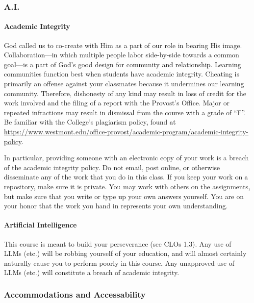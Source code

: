 \documentclass[
  twoside]{article}
\begin{document}
\subsubsection{A.I.}\label{a.i.}

\paragraph{Academic Integrity}\label{academic-integrity}

God called us to co-create with Him as a part of our role in bearing His
image. Collaboration---in which multiple people labor side-by-side
towards a common goal---is a part of God's good design for community and
relationship. Learning communities function best when students have
academic integrity. Cheating is primarily an offense against your
classmates because it undermines our learning community. Therefore,
dishonesty of any kind may result in loss of credit for the work
involved and the filing of a report with the Provost's Office. Major or
repeated infractions may result in dismissal from the course with a
grade of ``F''. Be familiar with the College's plagiarism policy, found
at
\url{https://www.westmont.edu/office-provost/academic-program/academic-integrity-policy}.

In particular, providing someone with an electronic copy of your work is
a breach of the academic integrity policy. Do not email, post online, or
otherwise disseminate any of the work that you do in this class. If you
keep your work on a repository, make sure it is private. You may work
with others on the assignments, but make sure that you write or type up
your own answers yourself. You are on your honor that the work you hand
in represents your own understanding.

\paragraph{Artificial Intelligence}\label{artificial-intelligence}

This course is meant to build your perseverance (see CLOs 1,3). Any use
of LLMs (etc.) will be robbing yourself of your education, and will
almost certainly naturally cause you to perform poorly in this course.
Any unapproved use of LLMs (etc.) will constitute a breach of academic
integrity.

\subsubsection{Accommodations and
Accessability}\label{accommodations-and-accessability}
\end{document}
